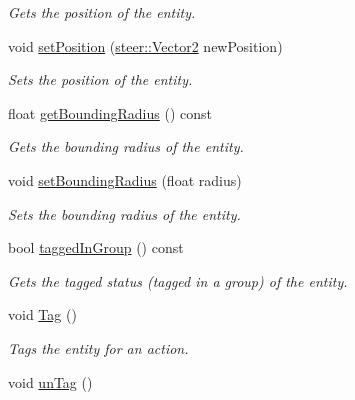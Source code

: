 \begin{DoxyCompactItemize}
\begin{DoxyCompactList}\small\item\em Gets the position of the entity. \end{DoxyCompactList}\item 
void \hyperlink{classsteer_1_1_agent_a44efb0c0431d55a9785a81d36e0c8fd8}{set\-Position} (\hyperlink{structsteer_1_1_vector2}{steer\-::\-Vector2} new\-Position)
\begin{DoxyCompactList}\small\item\em Sets the position of the entity. \end{DoxyCompactList}\item 
\hypertarget{classsteer_1_1_agent_ad970d8e4e75ea206d230c83ae455d40f}{float \hyperlink{classsteer_1_1_agent_ad970d8e4e75ea206d230c83ae455d40f}{get\-Bounding\-Radius} () const }\label{classsteer_1_1_agent_ad970d8e4e75ea206d230c83ae455d40f}

\begin{DoxyCompactList}\small\item\em Gets the bounding radius of the entity. \end{DoxyCompactList}\item 
void \hyperlink{classsteer_1_1_agent_a7b4578e8f22df3eaa819c8a927fc4a9b}{set\-Bounding\-Radius} (float radius)
\begin{DoxyCompactList}\small\item\em Sets the bounding radius of the entity. \end{DoxyCompactList}\item 
\hypertarget{classsteer_1_1_agent_a3a38a704a0aa83ab080ee429ccced58b}{bool \hyperlink{classsteer_1_1_agent_a3a38a704a0aa83ab080ee429ccced58b}{tagged\-In\-Group} () const }\label{classsteer_1_1_agent_a3a38a704a0aa83ab080ee429ccced58b}

\begin{DoxyCompactList}\small\item\em Gets the tagged status (tagged in a group) of the entity. \end{DoxyCompactList}\item 
\hypertarget{classsteer_1_1_agent_a590e8047a6891d86e404f1639b98bc90}{void \hyperlink{classsteer_1_1_agent_a590e8047a6891d86e404f1639b98bc90}{Tag} ()}\label{classsteer_1_1_agent_a590e8047a6891d86e404f1639b98bc90}

\begin{DoxyCompactList}\small\item\em Tags the entity for an action. \end{DoxyCompactList}\item 
\hypertarget{classsteer_1_1_agent_a44cb0b9e66b3b44b7e9a25471db02a32}{void \hyperlink{classsteer_1_1_agent_a44cb0b9e66b3b44b7e9a25471db02a32}{un\-Tag} ()}\label{classsteer_1_1_agent_a44cb0b9e66b3b44b7e9a25471db02a32}


\end{DoxyCompactItemize}
